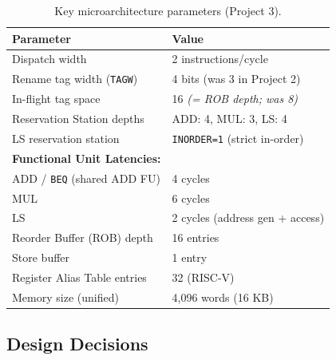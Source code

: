 \documentclass[11pt]{article}
\begin{document}
\begin{table}[h]
  \centering
  \begin{tabular}{ll}
    \toprule
    \textbf{Parameter}                  & \textbf{Value}                       \\
    \midrule
    Dispatch width                      & 2 instructions/cycle                 \\
    Rename tag width (\texttt{TAGW})    & 4 bits (was 3 in Project 2)          \\
    In-flight tag space                 & 16 \emph{(= ROB depth; was 8)}       \\
    Reservation Station depths          & ADD: 4, MUL: 3, LS: 4                \\
    LS reservation station              & \texttt{INORDER=1} (strict in-order) \\
    \midrule
    \textbf{Functional Unit Latencies:} &                                      \\
    ADD / \texttt{BEQ} (shared ADD FU)  & 4 cycles                             \\
    MUL                                 & 6 cycles                             \\
    LS                                  & 2 cycles (address gen + access)      \\
    \midrule
    Reorder Buffer (ROB) depth          & 16 entries                           \\
    Store buffer                        & 1 entry                              \\
    Register Alias Table entries        & 32 (RISC-V)                          \\
    Memory size (unified)               & 4,096 words (16 KB)                  \\
    \bottomrule
  \end{tabular}
  \caption{Key microarchitecture parameters (Project 3).}
  \label{tbl:arch_params}
\end{table}

\subsection{Design Decisions}
\end{document}
